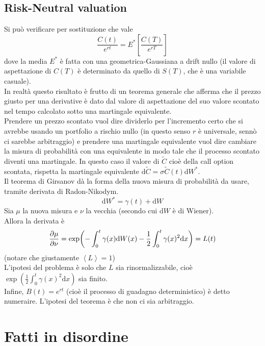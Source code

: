 \documentclass[a4paper,12pt]{article}
\theoremstyle{plain}
\theoremstyle{definition}
\newcommand{\f}[2]{\frac{#1}{#2}}
\newcommand{\ave}[1]{\left\langle#1\right\rangle }
\renewcommand{\d}{\text{d}}
\theoremstyle{remark}
\begin{document}
\subsection{Risk-Neutral valuation}
Si può verificare per sostituzione che vale
\[\f{C(t)}{e^{rt}}=E^*[\f{C(T)}{e^{rT}}]			\]
dove la media $E^*$ è fatta con una geometrica-Gaussiana a drift nullo (il valore di aspettazione di $C(T)$ è determinato da quello di $S(T)$, che è una variabile casuale).
\\In realtà questo risultato è frutto di un teorema generale che afferma che il prezzo giusto per una derivative è dato dal valore di aspettazione del suo valore scontato nel tempo calcolato sotto una martingale equivalente.\\ Prendere un prezzo scontato vuol dire dividerlo per l'incremento certo che si avrebbe usando un portfolio a rischio nullo (in questo senso $r$ è universale, sennò ci sarebbe arbitraggio) e prendere una martingale equivalente vuol dire cambiare la misura di probabilità con una equivalente in modo tale che il processo scontato diventi una martingale. In questo caso il valore di $\tilde{C}$ cioè della call option scontata, rispetta la martingale equivalente $\d \tilde{C}=\sigma \tilde{C}(t)\d W^*$.\\Il teorema di Girsanov dà la forma della nuova misura di probabilità da usare, tramite derivata di Radon-Nikodym.
\[\d W^*=\gamma(t)+\d W		\]
Sia $\mu$ la nuova misura e $\nu$ la vecchia (secondo cui $\d W$ è di Wiener).
\\Allora la derivata è
\[\pdv{\mu}{\nu}=\exp(-\int_0^t \gamma(x)\d W(x)-\f{1}{2}\int_0^t\gamma(x)^2\d x)=L(t)\]
(notare che giustamente $\ave{L}=1$)
\\L'ipotesi del problema è solo che $L$ sia rinormalizzabile, cioè $\exp(\f{1}{2}\int_0^t\gamma(x)^2\d x)$ sia finito.
\\Infine, $B(t)=e^{rt}$ (cioè il processo di guadagno deterministico) è detto numeraire. L'ipotesi del teorema è che non ci sia arbitraggio.
\section{Fatti in disordine}
\end{document}
